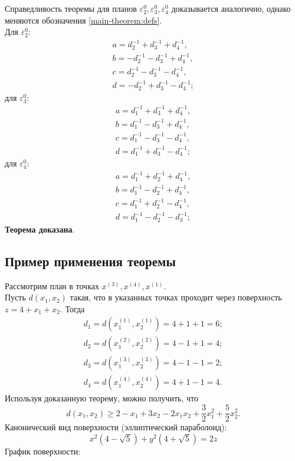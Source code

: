 Справедливость теоремы для планов $\varepsilon_2^0, \varepsilon_3^0,\varepsilon_4^0$ доказывается аналогично, однако меняются обозначения \eqref{main-theorem:defs}.\\ Для $\varepsilon_2^0$:
\begin{equation*} \begin{split}
a=d_2^{-1}+d_3^{-1}+d_4^{-1},\\
b=-d_2^{-1}-d_3^{-1}+d_4^{-1},\\
c=d_2^{-1}-d_3^{-1}-d_4^{-1},\\
d=-d_2^{-1}+d_3^{-1}-d_4^{-1};
\end{split}\end{equation*}
для $\varepsilon_3^0$:
\begin{equation*} \begin{split}
a=d_1^{-1}+d_3^{-1}+d_4^{-1},\\
b=d_1^{-1}-d_3^{-1}+d_4^{-1},\\
c=d_1^{-1}-d_3^{-1}-d_4^{-1},\\
d=d_1^{-1}+d_3^{-1}-d_4^{-1};
\end{split}\end{equation*}
для $\varepsilon_4^0$:
\begin{equation*} \begin{split}
a=d_1^{-1}+d_2^{-1}+d_4^{-1},\\
b=d_1^{-1}-d_2^{-1}+d_4^{-1},\\
c=d_1^{-1}+d_2^{-1}-d_4^{-1},\\
d=d_1^{-1}-d_2^{-1}-d_3^{-1};
\end{split}\end{equation*}
\textbf{Теорема доказана}.


\subsection{Пример применения теоремы}
Рассмотрим план в точках $x^{(3)}, x^{(4)}, x^{(1)}$.\\
Пусть $d(x_1, x_2)$ такая, что в указанных точках проходит через поверхность $z = 4 + x_1 + x_2$.
Тогда
\begin{gather*}
d_1 = d(x_1^{(1)}, x_2^{(1)}) = 4 + 1 + 1 = 6; \\
d_2 = d(x_1^{(2)}, x_2^{(2)}) = 4 -1 + 1 = 4; \\
d_3 = d(x_1^{(3)}, x_2^{(3)}) = 4 -1 - 1 = 2; \\
d_4 = d(x_1^{(4)}, x_2^{(4)}) = 4 + 1 - 1 = 4.
\end{gather*}
Используя доказанную теорему, можно получить, что
$$d(x_1, x_2) \ge 2 - x_1 + 3x_2 -2x_1x_2 +\frac{3}{2}x_1^2 + \frac 5 2 x_2^2.$$
Канонический вид поверхности (эллиптический параболоид):\\
$$x^2 (4 - \sqrt{5}) + y^2 (4 + \sqrt 5) = 2z$$
График поверхности:

